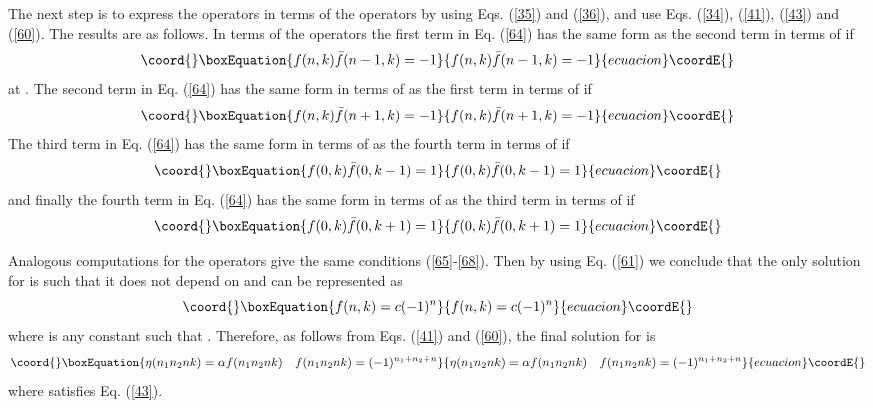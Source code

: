 \documentclass[a4paper,12pt]{article}%
\begin{document}
The next step is to express the \coordHE{} operators in terms
of the \coordHE{} operators by using Eqs. (\ref{35}) and 
(\ref{36}), and use Eqs. (\ref{34}), (\ref{41}), (\ref{43})
and (\ref{60}). The results are as follows. In terms of the
operators \coordHE{} the first term in Eq. (\ref{64}) has the
same form as the second term in terms of \coordHE{} if
\begin{equation}\coord{}\boxEquation{
f(n,k){\bar f}(n-1,k)=-1
\label{65}
}{
f(n,k){\bar f}(n-1,k)=-1
}{ecuacion}\coordE{}\end{equation}
at \coordHE{}. The second term in Eq. (\ref{64}) has the same 
form in terms of \coordHE{} as the first term in terms of 
\coordHE{} if 
\begin{equation}\coord{}\boxEquation{
f(n,k){\bar f}(n+1,k)=-1
\label{66}
}{
f(n,k){\bar f}(n+1,k)=-1
}{ecuacion}\coordE{}\end{equation}
The third term in Eq. (\ref{64}) has the same 
form in terms of \coordHE{} as the fourth term in terms of 
\coordHE{} if 
\begin{equation}\coord{}\boxEquation{
f(0,k){\bar f}(0,k-1)=1
\label{67}
}{
f(0,k){\bar f}(0,k-1)=1
}{ecuacion}\coordE{}\end{equation}
and finally the fourth term in Eq. (\ref{64}) has the same 
form in terms of \coordHE{} as the third term in terms of 
\coordHE{} if 
\begin{equation}\coord{}\boxEquation{
f(0,k){\bar f}(0,k+1)=1
\label{68}
}{
f(0,k){\bar f}(0,k+1)=1
}{ecuacion}\coordE{}\end{equation}

Analogous computations for the operators \coordHE{} give
the same conditions (\ref{65}-\ref{68}). Then by using Eq.
(\ref{61}) we conclude that the only solution for \coordHE{}
is such that it does not depend on \coordHE{} and can be represented
as 
\begin{equation}\coord{}\boxEquation{
f(n,k)=c (-1)^n 
\label{69}
}{
f(n,k)=c (-1)^n 
}{ecuacion}\coordE{}\end{equation}
where \coordHE{} is any constant such that \coordHE{}. Therefore,
as follows from Eqs. (\ref{41}) and (\ref{60}), the
final solution for \coordHE{} is
\begin{equation}\coord{}\boxEquation{
\eta(n_1n_2nk)=\alpha f(n_1n_2nk)\quad f(n_1n_2nk)=(-1)^{n_1+n_2+n}
\label{70}
}{
\eta(n_1n_2nk)=\alpha f(n_1n_2nk)\quad f(n_1n_2nk)=(-1)^{n_1+n_2+n}
}{ecuacion}\coordE{}\end{equation}
where \myHighlight{$\alpha$}\coordHE{} satisfies Eq. (\ref{43}).
\end{document}
